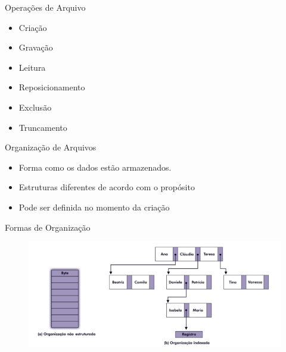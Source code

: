 \documentclass[aspectratio=169,
				xcolor=table]{beamer}
\begin{document}
	\begin{frame}{Operações de Arquivo }
		\begin{itemize}
			\item Criação
			\vspace{1em}
			\item Gravação
			\vspace{1em}
			\item Leitura
			\vspace{1em}
			\item Reposicionamento
			\vspace{1em}
			\item Exclusão
			\vspace{1em}
			\item Truncamento		
		\end{itemize}
	
	\end{frame}
	
	\begin{frame}{Organização de Arquivos}
		\begin{itemize}			
			\item Forma como os dados estão armazenados.
			\vspace{1em}
			\item Estruturas diferentes de acordo com o propósito
			\vspace{1em}
			\item Pode ser definida no momento da criação
		\end{itemize}
	\end{frame}
	
	\begin{frame}{Formas de Organização}
		
		\begin{figure}[hbtp]
			\centering
			\includegraphics[height=.7\paperheight]{../figs/cap09/organizacao.png}
		\end{figure}		
	\end{frame}
	
\end{document}
